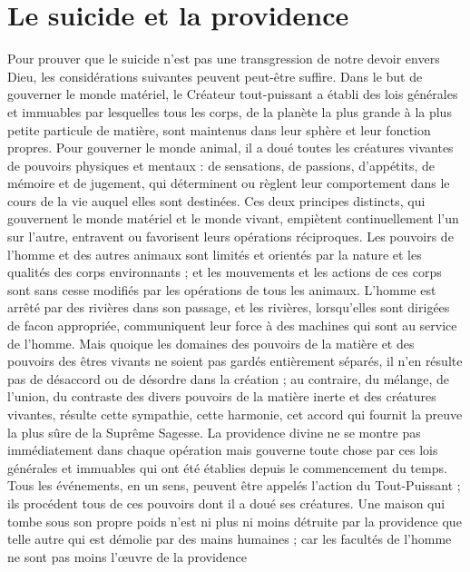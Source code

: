 
\section{Le suicide et la providence}

Pour prouver que le suicide n’est pas une transgression
de notre devoir envers Dieu, les considérations suivantes
peuvent peut-être suffire. Dans le but de gouverner le
monde matériel, le Créateur tout-puissant a établi des
lois générales et immuables par lesquelles tous les corps,
de la planète la plus grande à la plus petite particule de
matière, sont maintenus dans leur sphère et leur fonction
propres. Pour gouverner le monde animal, il a doué toutes
les créatures vivantes de pouvoirs physiques et mentaux :
de sensations, de passions, d’appétits, de mémoire et de
jugement, qui déterminent ou règlent leur comportement
dans le cours de la vie auquel elles sont destinées. Ces
deux principes distincts, qui gouvernent le monde matériel
et le monde vivant, empiètent continuellement l'un sur
l'autre, entravent ou favorisent leurs opérations réciproques. 
Les pouvoirs de l'homme et des autres animaux
sont limités et orientés par la nature et les qualités des
corps environnants ; et les mouvements et les actions de
ces corps sont sans cesse modifiés par les opérations de
tous les animaux. L’homme est arrêté par des rivières
dans son passage, et les rivières, lorsqu’elles sont dirigées
de facon appropriée, communiquent leur force à des
machines qui sont au service de l'homme. Mais quoique
les domaines des pouvoirs de la matière et des pouvoirs des
êtres vivants ne soient pas gardés entièrement séparés,
il n’en résulte pas de désaccord ou de désordre dans la
création ; au contraire, du mélange, de l'union, du contraste
des divers pouvoirs de la matière inerte et des créatures
vivantes, résulte cette sympathie, cette harmonie, cet
accord qui fournit la preuve la plus sûre de la Suprême
Sagesse. La providence divine ne se montre pas immédiatement
dans chaque opération mais gouverne toute chose
par ces lois générales et immuables qui ont été établies
depuis le commencement du temps. Tous les événements,
en un sens, peuvent être appelés l’action du Tout-Puissant ;
ils procédent tous de ces pouvoirs dont il a doué ses créatures. 
Une maison qui tombe sous son propre poids n’est
ni plus ni moins détruite par la providence que telle autre
qui est démolie par des mains humaines ; car les facultés
de l'homme ne sont pas moins l’{\oe}uvre de la providence
